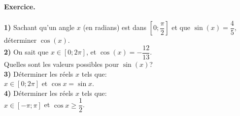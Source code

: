\documentclass[fontsize=23pt]{scrreprt}%
\renewcommand{\geq}{\geqslant}
\begin{document}
\paragraph{Exercice.} \textbf{1)} Sachant qu'un angle $x$ (en radians) est dans $[0;\dfrac{\pi}{2}]$ et que  $\sin(x)=\dfrac{4}{5}$, déterminer  $\cos(x)$. \\
\textbf{2)} On sait que $x\in [0;2\pi]$, et $\cos(x)=-\dfrac{12}{13}$. \\
Quelles sont les valeurs possibles pour  $\sin(x)$? \\[0.5ex]
\textbf{3)} Déterminer les réels $x$ tels que:\\ 
$x\in [0;2\pi]$ et $\cos x=\sin x$.\\[0.5ex]
\textbf{4)} Déterminer les réels $x$ tels que:\\ 
$x\in [-\pi;\pi]$ et $\cos x\geq \dfrac{1}{2}$.
\newpage
\rule{0pt}{3cm}
\end{document}
